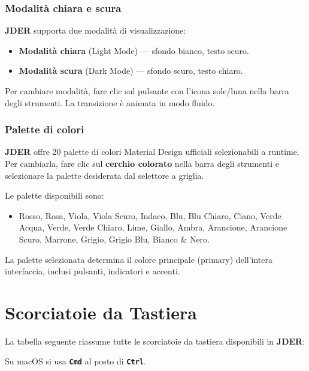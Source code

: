 \documentclass[a4paper,11pt]{article}
\newcommand{\key}[1]{\texttt{\textbf{#1}}}
\newcommand{\jder}{\textbf{JDER}}
\begin{document}
\subsubsection{Modalità chiara e scura}

\jder{} supporta due modalità di visualizzazione:
\begin{itemize}
  \item \textbf{Modalità chiara} (Light Mode) --- sfondo bianco, testo scuro.
  \item \textbf{Modalità scura} (Dark Mode) --- sfondo scuro, testo chiaro.
\end{itemize}

Per cambiare modalità, fare clic sul pulsante con l'icona sole/luna nella barra degli strumenti.
La transizione è animata in modo fluido.

\subsubsection{Palette di colori}

\jder{} offre 20 palette di colori Material Design ufficiali selezionabili a runtime.
Per cambiarla, fare clic sul \textbf{cerchio colorato} nella barra degli strumenti e selezionare
la palette desiderata dal selettore a griglia.

Le palette disponibili sono:
\begin{itemize}
  \item Rosso, Rosa, Viola, Viola Scuro, Indaco, Blu, Blu Chiaro, Ciano,
        Verde Acqua, Verde, Verde Chiaro, Lime, Giallo, Ambra, Arancione,
        Arancione Scuro, Marrone, Grigio, Grigio Blu, Bianco \& Nero.
\end{itemize}

La palette selezionata determina il colore principale (primary) dell'intera interfaccia,
inclusi pulsanti, indicatori e accenti.

\section{Scorciatoie da Tastiera}
\label{sec:shortcuts}

La tabella seguente riassume tutte le scorciatoie da tastiera disponibili in \jder{}:

Su macOS si usa \key{Cmd} al posto di \key{Ctrl}.
\end{document}
